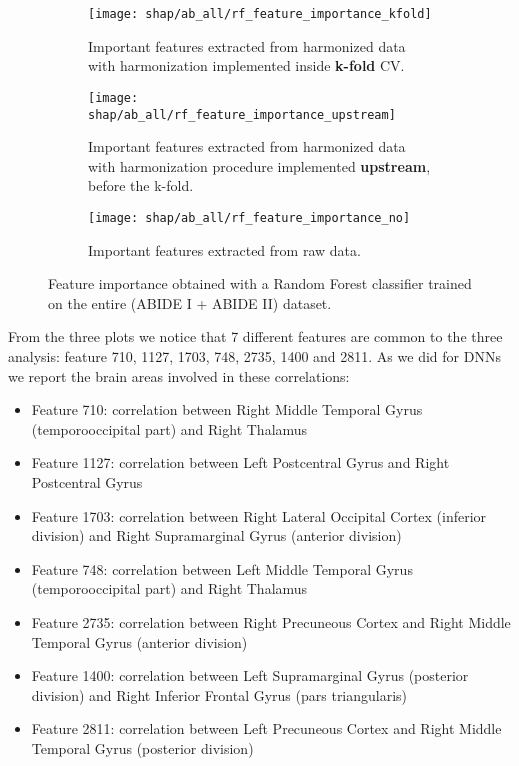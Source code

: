 \documentclass[11pt]{report}
\begin{document}
\begin{figure}
\centering
\begin{subfigure}[b]{.45\textwidth}
   \texttt{[image: shap/ab\_all/rf\_feature\_importance\_kfold]}
   \caption{Important features extracted from harmonized data with harmonization implemented inside \textbf{k-fold} CV.}
    
\end{subfigure}
\begin{subfigure}[b]{.45\textwidth}
   \texttt{[image: shap/ab\_all/rf\_feature\_importance\_upstream]}
   \caption{Important features extracted from harmonized data with harmonization procedure implemented \textbf{upstream}, before the k-fold.}
    
\end{subfigure}
\begin{subfigure}[b]{.45\textwidth}
   \texttt{[image: shap/ab\_all/rf\_feature\_importance\_no]}
   \caption{Important features extracted from raw data.}
\end{subfigure}
\caption{Feature importance obtained with a Random Forest classifier trained on the entire (ABIDE I + ABIDE II) dataset.}
\label{fig:shap_abide_rf_all}
\end{figure}


From the three plots we notice that 7 different features are common to the three analysis: feature 710, 1127, 1703, 748, 2735, 1400 and 2811.
As we did for DNNs we report the brain areas involved in these correlations:
\begin{itemize}
\item Feature 710: correlation between Right Middle Temporal Gyrus (temporooccipital part) and Right Thalamus
\item Feature 1127: correlation between Left Postcentral Gyrus  and Right Postcentral Gyrus
\item Feature 1703: correlation between Right Lateral Occipital Cortex (inferior division) and Right Supramarginal Gyrus (anterior division)
\item Feature 748: correlation between Left Middle Temporal Gyrus (temporooccipital part) and Right Thalamus
\item Feature 2735: correlation between Right Precuneous Cortex  and Right Middle Temporal Gyrus (anterior division)
\item Feature 1400: correlation between Left Supramarginal Gyrus (posterior division) and Right Inferior Frontal Gyrus (pars triangularis)
\item Feature 2811: correlation between Left Precuneous Cortex  and Right Middle Temporal Gyrus (posterior division)
\end{itemize}
\end{document}
